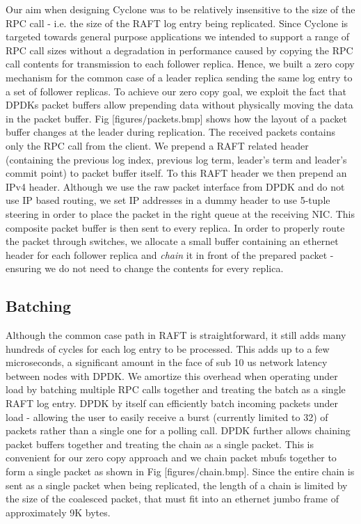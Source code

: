 \documentclass[twocolumn]{article}
\begin{document}
Our aim when designing Cyclone was to be relatively insensitive to the size of
the RPC call - i.e. the size of the RAFT log entry being replicated. Since
Cyclone is targeted towards general purpose applications we intended to support
a range of RPC call sizes without a degradation in performance caused by copying
the RPC call contents for transmission to each follower replica. Hence, we built
a zero copy mechanism for the common case of a leader replica sending the same
log entry to a set of follower replicas. To achieve our zero copy goal, we
exploit the fact that DPDKs packet buffers allow prepending data without
physically moving the data in the packet buffer. Fig [figures/packets.bmp] shows
how the layout of a packet buffer changes at the leader during replication. The
received packets contains only the RPC call from the client. We prepend a RAFT
related header (containing the previous log index, previous log term, leader's
term and leader's commit point) to packet buffer itself. To this RAFT header we
then prepend an IPv4 header. Although we use the raw packet interface from DPDK
and do not use IP based routing, we set IP addresses in a dummy header to use
5-tuple steering in order to place the packet in the right queue at the
receiving NIC. This composite packet buffer is then sent to every replica. In
order to properly route the packet through switches, we allocate a small buffer
containing an ethernet header for each follower replica and \emph{chain} it in
front of the prepared packet - ensuring we do not need to change the contents
for every replica.

\subsection{Batching}
Although the common case path in RAFT is straightforward, it still adds many
hundreds of cycles for each log entry to be processed. This adds up to a few
microseconds, a significant amount in the face of sub 10 us network latency
between nodes with DPDK. We amortize this overhead when operating under load by
batching multiple RPC calls together and treating the batch as a single RAFT log
entry.  DPDK by itself can efficiently batch incoming packets under load -
allowing the user to easily receive a burst (currently limited to 32) of packets
rather than a single one for a polling call. DPDK further allows chaining packet
buffers together and treating the chain as a single packet. This is convenient
for our zero copy approach and we chain packet mbufs together to form a single
packet as shown in Fig [figures/chain.bmp]. Since the entire chain is sent as a
single packet when being replicated, the length of a chain is limited by the
size of the coalesced packet, that must fit into an ethernet jumbo frame of
approximately 9K bytes.
\end{document}
